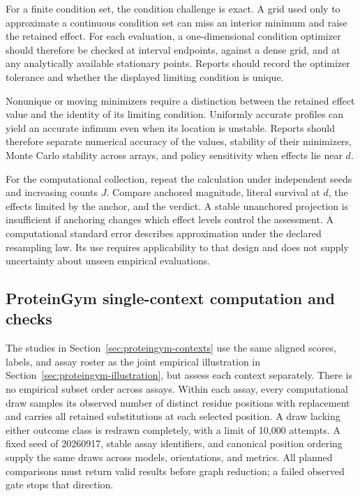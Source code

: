 \documentclass[11pt]{article}
\theoremstyle{remark}
\begin{document}
For a finite condition set, the condition challenge is exact. A grid used only
to approximate a continuous condition set can miss an interior minimum and
raise the retained effect. For each evaluation, a one-dimensional condition optimizer
should therefore be checked at interval endpoints, against a dense grid, and
at any analytically available stationary points. Reports should record the
optimizer tolerance and whether the displayed limiting condition is unique.

Nonunique or moving minimizers require a distinction between the retained
effect value and the identity of its limiting condition. Uniformly accurate
profiles can yield an accurate infimum even when its location is unstable.
Reports should therefore separate numerical accuracy of the values, stability
of their minimizers, Monte Carlo stability across arrays, and policy
sensitivity when effects lie near $d$.

For the computational collection, repeat the calculation under independent
seeds and increasing counts $J$. Compare anchored magnitude, literal survival
at $d$, the effects limited by the anchor, and the verdict. A stable
unanchored projection is insufficient if anchoring changes which effect levels
control the assessment. A computational standard error describes approximation under
the declared resampling law. Its use requires applicability to that design
and does not supply uncertainty about unseen empirical evaluations.

\subsection{ProteinGym single-context computation and checks}
\label{app:proteingym-context-checks}

The studies in Section~\ref{sec:proteingym-contexts} use the same aligned
scores, labels, and assay roster as the joint empirical illustration in
Section~\ref{sec:proteingym-illustration}, but assess each context separately.
There is no empirical subset order across assays. Within each assay, every
computational draw samples its observed number of distinct residue positions
with replacement and carries all retained substitutions at each selected
position. A draw lacking either outcome class is redrawn completely, with a
limit of 10,000 attempts. A fixed seed of 20260917, stable assay identifiers,
and canonical position ordering supply the same draws across models,
orientations, and metrics. All planned comparisons must return valid results
before graph reduction; a failed observed gate stops that direction.
\end{document}
